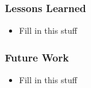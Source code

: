 \documentclass[final]{beamer}
\begin{document}
\begin{frame}
	\frametitle{Lessons Learned}
	\begin{beamerboxesrounded}[shadow]{}
		\begin{itemize}
			\item{Fill in this stuff}
		\end{itemize}
	\end{beamerboxesrounded}
\end{frame}

\begin{frame}
	\frametitle{Future Work}
	\begin{beamerboxesrounded}[shadow]{}
		\begin{itemize}
			\item{Fill in this stuff}
		\end{itemize}
	\end{beamerboxesrounded}
\end{frame}
\end{document}
